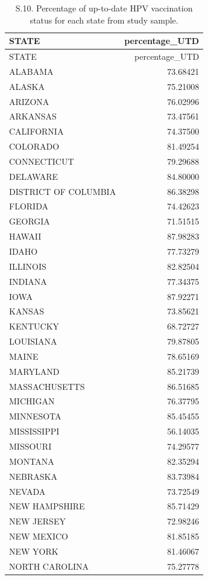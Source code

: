 \documentclass[
  letterpaper,
  DIV=11,
  numbers=noendperiod]{scrartcl}
\begin{document}
\begin{longtable}[]{@{}lr@{}}
\caption{S.10. Percentage of up-to-date HPV vaccination status for each
state from study sample.}\tabularnewline
\toprule\noalign{}
STATE & percentage\_UTD \\
\midrule\noalign{}
\endfirsthead
\toprule\noalign{}
STATE & percentage\_UTD \\
\midrule\noalign{}
\endhead
\bottomrule\noalign{}
\endlastfoot
ALABAMA & 73.68421 \\
ALASKA & 75.21008 \\
ARIZONA & 76.02996 \\
ARKANSAS & 73.47561 \\
CALIFORNIA & 74.37500 \\
COLORADO & 81.49254 \\
CONNECTICUT & 79.29688 \\
DELAWARE & 84.80000 \\
DISTRICT OF COLUMBIA & 86.38298 \\
FLORIDA & 74.42623 \\
GEORGIA & 71.51515 \\
HAWAII & 87.98283 \\
IDAHO & 77.73279 \\
ILLINOIS & 82.82504 \\
INDIANA & 77.34375 \\
IOWA & 87.92271 \\
KANSAS & 73.85621 \\
KENTUCKY & 68.72727 \\
LOUISIANA & 79.87805 \\
MAINE & 78.65169 \\
MARYLAND & 85.21739 \\
MASSACHUSETTS & 86.51685 \\
MICHIGAN & 76.37795 \\
MINNESOTA & 85.45455 \\
MISSISSIPPI & 56.14035 \\
MISSOURI & 74.29577 \\
MONTANA & 82.35294 \\
NEBRASKA & 83.73984 \\
NEVADA & 73.72549 \\
NEW HAMPSHIRE & 85.71429 \\
NEW JERSEY & 72.98246 \\
NEW MEXICO & 81.85185 \\
NEW YORK & 81.46067 \\
NORTH CAROLINA & 75.27778 \\

\end{longtable}
\end{document}
